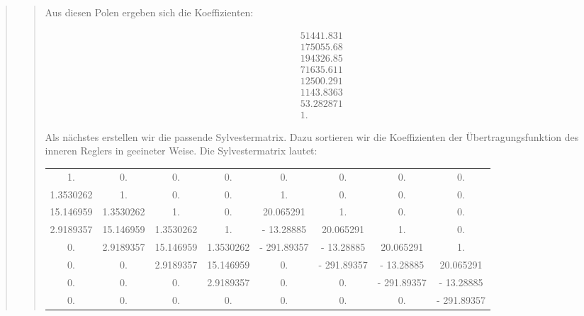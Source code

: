 \begin{quote}
\begin{quote}
        
        Aus diesen Polen ergeben sich die Koeffizienten:
        
        
        \begin{equation*}
        \begin{split}
            51441.831\\
            175055.68\\
            194326.85\\
            71635.611\\
            12500.291\\
            1143.8363\\
            53.282871\\
            1.
        \end{split}
        \end{equation*}
        
        
        Als nächstes erstellen wir die passende Sylvestermatrix. Dazu sortieren wir die Koeffizienten der
        Übertragungsfunktion des inneren Reglers in geeineter Weise. Die Sylvestermatrix lautet:
        
        \begin{table}[H]
        \hspace{-4em}
        \begin{tabular}{c c c c c c c c}

            1.           &0.           &0.           &0.           &0.           &0.           &0.           &0. \\
            1.3530262    &1.           &0.           &0.           &1.           &0.           &0.           &0. \\      
            15.146959    &1.3530262    &1.           &0.           &20.065291    &1.           &0.           &0. \\        
            2.9189357    &15.146959    &1.3530262    &1.         &- 13.28885     &20.065291    &1.           &0. \\      
            0.           &2.9189357    &15.146959    &1.3530262  &- 291.89357  &- 13.28885     &20.065291    &1. \\      
            0.           &0.           &2.9189357    &15.146959    &0.         &- 291.89357  &- 13.28885     &20.065291\\
            0.           &0.           &0.           &2.9189357    &0.           &0.         &- 291.89357  &- 13.28885\\   
            0.           &0.           &0.           &0.           &0.           &0.           &0.         &-
            291.89357\\
        

\end{tabular}
\end{table}
\end{quote}
\end{quote}
